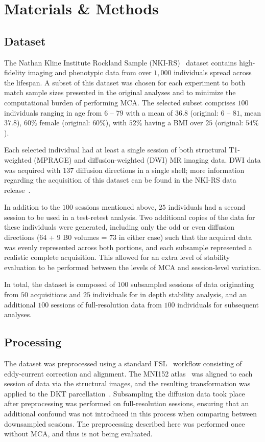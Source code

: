 \documentclass[10pt,letterpaper]{article}
\begin{document}
\section*{Materials \& Methods}

\subsection*{Dataset}
The Nathan Kline Institute Rockland Sample (NKI-RS)~\cite{Nooner2012-eg} dataset
contains high-fidelity imaging and phenotypic data from over $1,000$ individuals
spread across the lifespan. A subset of this dataset was chosen for each experiment
to both match sample sizes presented in the original analyses and to minimize the
computational burden of performing MCA. The selected subset comprises $100$
individuals ranging in age from $6$ – $79$ with a mean of $36.8$ (original:
$6$ – $81$, mean $37.8$), $60\%$ female (original: $60\%$), with $52\%$ having a BMI
over $25$ (original: $54\%$).

Each selected individual had at least a single session of both structural T1-weighted 
(MPRAGE) and diffusion-weighted (DWI) MR imaging data. DWI data was acquired with
$137$ diffusion directions in a single shell; more information regarding the
acquisition of this dataset can be found in the NKI-RS data release~\cite{Nooner2012-eg}.

In addition to the $100$ sessions mentioned above, $25$ individuals had a second
session to be used in a test-retest analysis. Two additional copies of the data for
these individuals were generated, including only the odd or even diffusion
directions ($64$ + $9$ B0 volumes = $73$ in either case) such that the acquired data
was evenly represented across both portions, and each subsample represented a
realistic complete acquisition. This allowed for an extra level of stability
evaluation to be performed between the levels of MCA and session-level variation.

In total, the dataset is composed of $100$ subsampled sessions of data originating
from $50$ acquisitions and $25$ individuals for in depth stability analysis, and an
additional $100$ sessions of full-resolution data from $100$ individuals for
subsequent analyses.


\subsection*{Processing}
The dataset was preprocessed using a standard FSL~\cite{Jenkinson2012-ly} workflow
consisting of eddy-current correction and alignment. The MNI152
atlas~\cite{lancaster2007bias} was aligned to each session of data via the structural 
images, and the resulting transformation was applied to the DKT
parcellation~\cite{Klein2012-vi}. Subsampling the diffusion data took place after
preprocessing was performed on full-resolution sessions, ensuring that an additional
confound was not introduced in this process when comparing between downsampled
sessions. The preprocessing described here was performed once without MCA, and thus
is not being evaluated.
\end{document}
